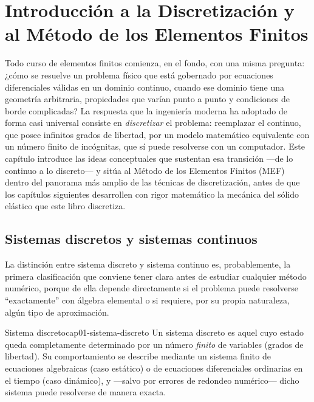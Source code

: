 \chapter{Introducción a la Discretización y al Método de los Elementos Finitos}
\label{sec:cap01-introduccion}

Todo curso de elementos finitos comienza, en el fondo, con una misma pregunta: ¿cómo se resuelve un problema físico que está gobernado por ecuaciones diferenciales válidas en un dominio continuo, cuando ese dominio tiene una geometría arbitraria, propiedades que varían punto a punto y condiciones de borde complicadas? La respuesta que la ingeniería moderna ha adoptado de forma casi universal consiste en \emph{discretizar} el problema: reemplazar el continuo, que posee infinitos grados de libertad, por un modelo matemático equivalente con un número finito de incógnitas, que sí puede resolverse con un computador. Este capítulo introduce las ideas conceptuales que sustentan esa transición —de lo continuo a lo discreto— y sitúa al Método de los Elementos Finitos (MEF) dentro del panorama más amplio de las técnicas de discretización, antes de que los capítulos siguientes desarrollen con rigor matemático la mecánica del sólido elástico que este libro discretiza.

\section{Sistemas discretos y sistemas continuos}
\label{sec:cap01-discreto-continuo}

La distinción entre sistema discreto y sistema continuo es, probablemente, la primera clasificación que conviene tener clara antes de estudiar cualquier método numérico, porque de ella depende directamente si el problema puede resolverse ``exactamente'' con álgebra elemental o si requiere, por su propia naturaleza, algún tipo de aproximación.

\begin{definicion}{Sistema discreto}{cap01-sistema-discreto}
Un sistema discreto es aquel cuyo estado queda completamente determinado por un número \emph{finito} de variables (grados de libertad). Su comportamiento se describe mediante un sistema finito de ecuaciones algebraicas (caso estático) o de ecuaciones diferenciales ordinarias en el tiempo (caso dinámico), y —salvo por errores de redondeo numérico— dicho sistema puede resolverse de manera exacta.
\end{definicion}

